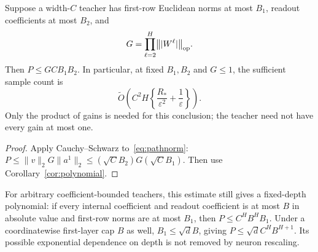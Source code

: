 \begin{corollary}
\label{cor:width-depth}
Suppose a width-$C$ teacher has first-row Euclidean norms at most $B_1$, readout coefficients at most $B_2$, and
\[
 G=\prod_{\ell=2}^H\bigl\||W^\ell|\bigr\|_{\mathrm{op}}.
\]
Then $P\le GCB_1B_2$. In particular, at fixed $B_1,B_2$ and $G\le1$, the sufficient sample count is
\[
 \widetilde O\left(C^2H\left\{\frac{R_*}{\varepsilon^2}+\frac1\varepsilon\right\}\right).
\]
Only the product of gains is needed for this conclusion; the teacher need not have every gain at most one.
\end{corollary}
\begin{proof}
Apply Cauchy--Schwarz to~\eqref{eq:pathnorm}: $P\le\|v\|_2G\|a^1\|_2\le(\sqrt C B_2)G(\sqrt C B_1)$. Then use Corollary~\ref{cor:polynomial}.
\end{proof}

For arbitrary coefficient-bounded teachers, this estimate still gives a fixed-depth polynomial: if every internal coefficient and readout coefficient is at most $B$ in absolute value and first-row norms are at most $B_1$, then $P\le C^HB^HB_1$. Under a coordinatewise first-layer cap $B$ as well, $B_1\le\sqrt d B$, giving $P\le\sqrt d C^HB^{H+1}$. Its possible exponential dependence on depth is not removed by neuron rescaling.
